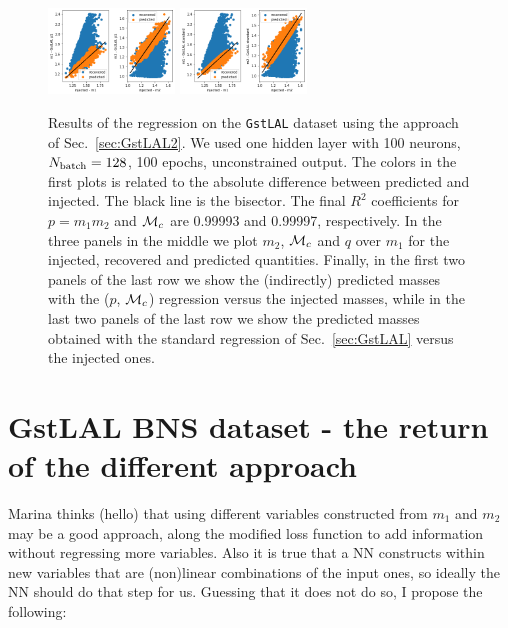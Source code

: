 \documentclass[prd,aps,twocolumn,a4paper,showkeys,nofootinbib]{article}
\def\Mc{{\cal M}_c}
\begin{document}
\begin{figure}[]
  \includegraphics[width=0.3\textwidth]{./Figs/GstLAL_p_m1m2.png}
  \hspace{0.3cm}
  \includegraphics[width=0.3\textwidth]{./Figs/GstLAL_standard_m1m2.png}
  \caption{\label{fig:GstLAL2_results} Results of the regression on the \texttt{GstLAL}
  dataset using the approach of Sec.~\ref{sec:GstLAL2}. 
  We used one hidden layer with 100 neurons, $N_{\rm batch}=128$, 100 epochs,  
  unconstrained output.
  The colors in the first plots is related to the absolute difference between predicted 
  and injected. The black line is the bisector.
  The final $R^2$ coefficients for $p=m_1 m_2$ and $\Mc$ are 0.99993 and 0.99997,
  respectively.
  In the three panels in the middle we plot $m_2$, $\Mc$ and $q$ over $m_1$ for 
  the injected, recovered and predicted quantities.
  Finally, in the first two panels of the last row we show the (indirectly) predicted masses 
  with the ($p$, $\Mc$) regression versus the injected masses, 
  while in the last two panels of the last row we show the 
  predicted masses obtained with the standard regression of Sec.~\ref{sec:GstLAL} versus 
  the injected ones.}
\end{figure}

\section{GstLAL BNS dataset - the return of the different approach}
\label{sec:GstLAL3}
Marina thinks (hello) that using different variables constructed from $m_1$ and $m_2$ may be a good approach, along the modified loss function to add information without regressing more variables. Also it is true that a NN constructs within new variables that are (non)linear combinations of the input ones, so ideally the NN should do that step for us. Guessing that it does not do so, I propose the following:
\end{document}
